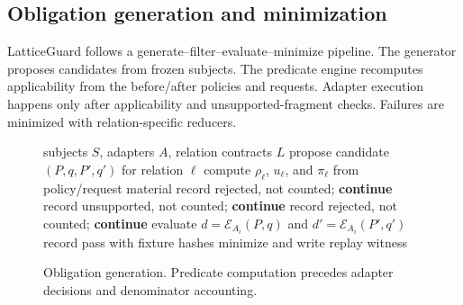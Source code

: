 \documentclass[10pt,conference]{IEEEtran}
\newcommand{\Eval}{\mathcal{E}}
\begin{document}
\subsection{Obligation generation and minimization}
\label{sec:algorithm}
LatticeGuard follows a generate--filter--evaluate--minimize pipeline.  The generator proposes candidates from frozen subjects.  The predicate engine recomputes applicability from the before/after policies and requests.  Adapter execution happens only after applicability and unsupported-fragment checks.  Failures are minimized with relation-specific reducers.

\begin{figure}[t]
\centering
\begin{algorithmic}[1]
\REQUIRE subjects $S$, adapters $A$, relation contracts $L$
  \STATE propose candidate $(P,q,P',q')$ for relation $\ell$
  \STATE compute $\rho_\ell$, $u_\ell$, and $\pi_\ell$ from policy/request material
   \STATE record rejected, not counted; \textbf{continue} \ENDIF
   \STATE record unsupported, not counted; \textbf{continue} \ENDIF
   \STATE record rejected, not counted; \textbf{continue} \ENDIF
    \STATE evaluate $d=\Eval_{A_i}(P,q)$ and $d'=\Eval_{A_i}(P',q')$
     \STATE record pass with fixture hashes
    \ELSE \STATE minimize and write replay witness
    \ENDIF
  \ENDFOR
\ENDFOR
\end{algorithmic}
\caption{Obligation generation.  Predicate computation precedes adapter decisions and denominator accounting.}
\label{fig:algorithm}
\end{figure}
\end{document}
